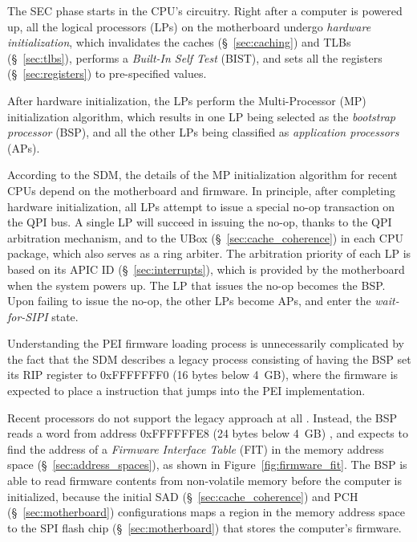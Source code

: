 The SEC phase starts in the CPU's circuitry. Right after a computer is powered
up, all the logical processors (LPs) on the motherboard undergo
\textit{hardware initialization}, which invalidates the caches
(\S~\ref{sec:caching}) and TLBs (\S~\ref{sec:tlbs}), performs a
\textit{Built-In Self Test} (BIST), and sets all the registers
(\S~\ref{sec:registers}) to pre-specified values.


After hardware initialization, the LPs perform the Multi-Processor (MP)
initialization algorithm, which results in one LP being selected as the
\textit{bootstrap processor} (BSP), and all the other LPs being classified as
\textit{application processors} (APs).

According to the SDM, the details of the MP initialization algorithm for recent
CPUs depend on the motherboard and firmware. In principle, after completing
hardware initialization, all LPs attempt to issue a special no-op transaction
on the QPI bus. A single LP will succeed in issuing the no-op, thanks to
the QPI arbitration mechanism, and to the UBox (\S~\ref{sec:cache_coherence})
in each CPU package, which also serves as a ring arbiter. The arbitration
priority of each LP is based on its APIC ID (\S~\ref{sec:interrupts}), which is
provided by the motherboard when the system powers up. The LP that issues the
no-op becomes the BSP. Upon failing to issue the no-op, the other LPs become
APs, and enter the \textit{wait-for-SIPI} state.


Understanding the PEI firmware loading process is unnecessarily complicated by
the fact that the SDM describes a legacy process consisting of having the BSP
set its RIP register to 0xFFFFFFF0 (16 bytes below 4~GB), where the firmware is
expected to place a instruction that jumps into the PEI implementation.


Recent processors do not support the legacy approach at all
\cite{reinauer2013fitpatch}. Instead, the BSP reads a word from address
0xFFFFFFE8 (24 bytes below 4~GB) \cite{intel2012uefihypervisor, datta2013acm},
and expects to find the address of a \textit{Firmware Interface Table} (FIT)
in the memory address space (\S~\ref{sec:address_spaces}), as shown in
Figure~\ref{fig:firmware_fit}. The BSP is able to read firmware contents from
non-volatile memory before the computer is initialized, because the initial SAD
(\S~\ref{sec:cache_coherence}) and PCH (\S~\ref{sec:motherboard})
configurations maps a region in the memory address space to the SPI flash chip
(\S~\ref{sec:motherboard}) that stores the computer's firmware.

